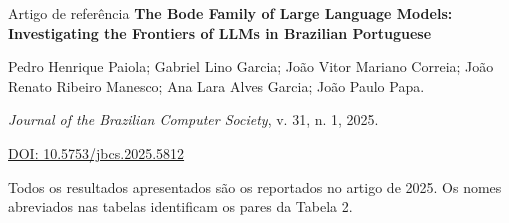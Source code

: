 \documentclass[aspectratio=169,xcolor=table]{beamer}
\begin{document}
\appendix
\begin{frame}[noframenumbering]{Artigo de referência}
\textbf{The Bode Family of Large Language Models: Investigating the Frontiers of LLMs in Brazilian Portuguese}

Pedro Henrique Paiola; Gabriel Lino Garcia; João Vitor Mariano Correia; João Renato Ribeiro Manesco; Ana Lara Alves Garcia; João Paulo Papa.

\textit{Journal of the Brazilian Computer Society}, v. 31, n. 1, 2025.

\href{https://doi.org/10.5753/jbcs.2025.5812}{DOI: 10.5753/jbcs.2025.5812}

\small Todos os resultados apresentados são os reportados no artigo de 2025. Os nomes abreviados nas tabelas identificam os pares da Tabela 2.
\end{frame}
\end{document}

